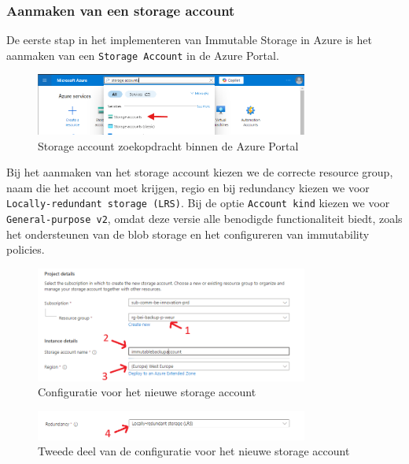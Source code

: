 \subsubsection{Aanmaken van een storage account}
De eerste stap in het implementeren van Immutable Storage in Azure is het aanmaken van een \texttt{Storage Account} in de Azure Portal. 
\begin{figure}[h]
    \centering
    \captionsetup{justification=centering}    
    \includegraphics[width=0.8\textwidth]{img/1imm.png}
    \caption{Storage account zoekopdracht binnen de Azure Portal}
\end{figure}
Bij het aanmaken van het storage account kiezen we de correcte resource group, naam die het account moet krijgen, regio en bij redundancy kiezen we voor \texttt{Locally-redundant storage (LRS)}. Bij de optie \texttt{Account kind} kiezen we voor \texttt{General-purpose v2}, omdat deze versie alle benodigde functionaliteit biedt, zoals het ondersteunen van de blob storage en het configureren van immutability policies. 
\begin{figure}[h]
    \centering
    \captionsetup{justification=centering}    
    \includegraphics[width=0.8\textwidth]{img/3.1imm.png}
    \caption{Configuratie voor het nieuwe storage account}
\end{figure}
\begin{figure}[h]
    \centering
    \captionsetup{justification=centering}    
    \includegraphics[width=0.8\textwidth]{img/3.2imm.png}
    \caption{Tweede deel van de configuratie voor het nieuwe storage account}
\end{figure}
\newpage
